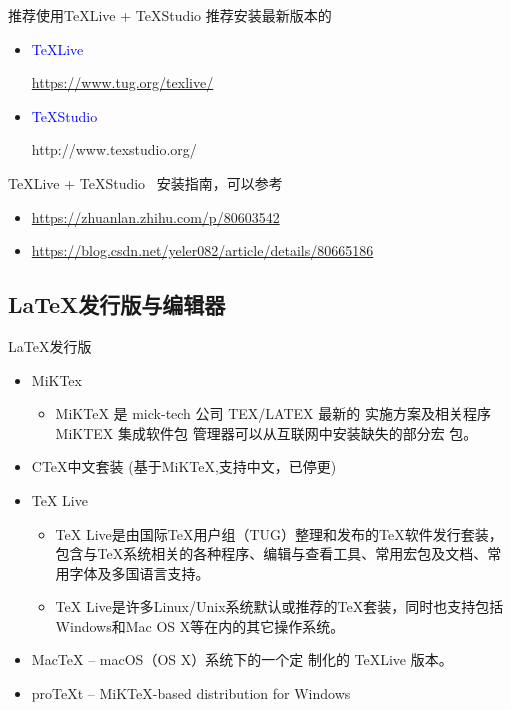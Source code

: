\documentclass[13pt]{ctexbeamer}
\newcommand{\blue}[1]{\textcolor{blue}{#1}}
\begin{document}
    
    \begin{frame}{推荐使用TeXLive + TeXStudio }
    	推荐安装最新版本的
    	
    	\begin{itemize}
    		\item \blue{TeXLive} 
    		
    		\href{https://www.tug.org/texlive/}{https://www.tug.org/texlive/}
    		
    		
    		
    		\item \blue{TeXStudio}
    		
    		http://www.texstudio.org/
    	\end{itemize}
    	
    	{TeXLive} + {TeXStudio}   ~安装指南，可以参考
    	\begin{itemize}
    		\item 	\href{https://zhuanlan.zhihu.com/p/80603542}{https://zhuanlan.zhihu.com/p/80603542}
    		\item \href{https://blog.csdn.net/yeler082/article/details/80665186}{https://blog.csdn.net/yeler082/article/details/80665186}
    	\end{itemize}
    \end{frame}

\subsection{LaTeX发行版与编辑器}
\begin{frame}{LaTeX发行版}
\begin{itemize}
	\item MiKTex 
		\begin{itemize}
	\item
	MiKTeX 是 mick-tech 公司 TEX/LATEX 最新的
实施方案及相关程序 MiKTEX 集成软件包
管理器可以从互联网中安装缺失的部分宏
包。
\end{itemize}
	\item CTeX中文套装 (基于MiKTeX,支持中文，已停更)
	
	\item \alert{TeX Live} 
	\begin{itemize}
	\item
	TeX Live是由国际TeX用户组（TUG）整理和发布的TeX软件发行套装，包含与TeX系统相关的各种程序、编辑与查看工具、常用宏包及文档、常用字体及多国语言支持。
		\item
	TeX Live是许多Linux/Unix系统默认或推荐的TeX套装，同时也支持包括Windows和Mac OS X等在内的其它操作系统。
	\end{itemize}

	\item MacTeX -- macOS（OS X）系统下的一个定
制化的 TeXLive 版本。

\item proTeXt -- MiKTeX-based distribution for Windows 
\end{itemize}
\end{frame}
\end{document}
